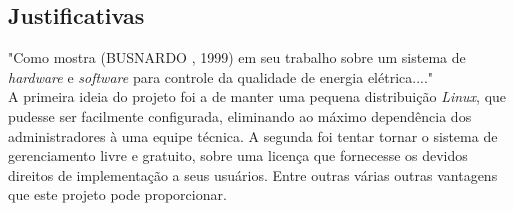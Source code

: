 \documentclass[a4paper, 12pt]{article}
\begin{document}
\subsection{Justificativas}
\indent\indent "Como mostra (BUSNARDO , 1999) em seu trabalho sobre um sistema de \textit{hardware} e \textit{software} para controle da qualidade de energia elétrica...."
\\
\indent A primeira ideia do projeto foi a de manter uma pequena distribuição \textit{Linux}, que pudesse ser facilmente configurada, eliminando ao máximo dependência 
dos administradores à uma equipe técnica. A segunda foi tentar tornar o sistema de gerenciamento livre e gratuito, sobre uma licença que fornecesse 
os devidos direitos de implementação a seus usuários. Entre outras várias outras vantagens que este projeto pode proporcionar.
\end{document}
